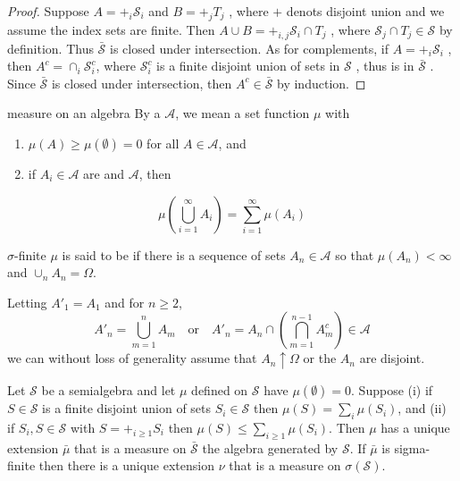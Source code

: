 \documentclass[../main.tex]{subfiles}
\begin{document}
\begin{proof}
    Suppose \(  A = + _{i} \mathcal{S}_{i}  \) and \(  B= + _{j} T_{j}  \) , where \(  +   \) denots disjoint union and we assume the index sets are finite. Then \(  A\cup B=  + _{i,j} \mathcal{S}_{i}\cap T_{j}  \) , where \(  \mathcal{S}_{j}\cap T_{j} \in \mathcal{S}  \) by definition.      Thus \(  \bar{\mathcal{S}}  \) is closed under intersection.  As for complements, if \(  A= + _{i}\mathcal{S}_{i}  \) , then \(  A^{c}= \cap _{i}\mathcal{S}_{i}^{c}  \), where \(  \mathcal{S}_{i}^{c}  \) is a finite disjoint union of sets in \(  \mathcal{S}  \) , thus is in \(  \bar{\mathcal{S}}  \) .  Since \(  \bar{\mathcal{S}}  \) is closed under intersection, then \(  A^{c} \in \bar{\mathcal{S}}  \) by induction.        
\end{proof}

\begin{definition}{measure on an algebra}{}
    By a  $\mathcal{A}$, we mean a set function $\mu$ with
\begin{enumerate}
    \item[(i)] $\mu(A) \geq \mu(\emptyset) = 0$ for all $A \in \mathcal{A}$, and
    \item[(ii)] if $A_i \in \mathcal{A}$ are  and  $\mathcal{A}$, then
\end{enumerate}
\[
\mu \left(\bigcup_{i=1}^{\infty} A_i\right) = \sum_{i=1}^{\infty} \mu(A_i)
\]

\end{definition}
\begin{definition}{\(   \sigma   \)-finite }{}
   $\mu$ is said to be  if there is a sequence of sets $A_n \in \mathcal{A}$ so that $\mu(A_n) < \infty$ and $\cup_n A_n = \Omega$. 
\end{definition}
\begin{remark}
    Letting $A'_1 = A_1$ and for $n \geq 2$,
\[
A'_n = \bigcup_{m=1}^n A_m \quad \text{or} \quad A'_n = A_n \cap \left(\bigcap_{m=1}^{n-1} A_m^c\right) \in \mathcal{A}
\]
we can without loss of generality assume that $A_n \uparrow \Omega$ or the $A_n$ are disjoint.

\end{remark}

\begin{theorem}{}{}
Let $\mathcal{S}$ be a semialgebra and let $\mu$ defined on $\mathcal{S}$ have $\mu(\emptyset) = 0$. Suppose (i) if $S \in \mathcal{S}$ is a finite disjoint union of sets $S_i \in \mathcal{S}$ then $\mu(S) = \sum_i \mu(S_i)$, and (ii) if $S_i, S \in \mathcal{S}$ with $S = +_{i \geq 1} S_i$ then $\mu(S) \leq \sum_{i \geq 1} \mu(S_i)$. Then $\mu$ has a unique extension $\bar{\mu}$ that is a measure on $\bar{\mathcal{S}}$ the algebra generated by $\mathcal{S}$. If $\bar{\mu}$ is sigma-finite then there is a unique extension $\nu$ that is a measure on $\sigma(\mathcal{S})$.
\end{theorem}
\end{document}
